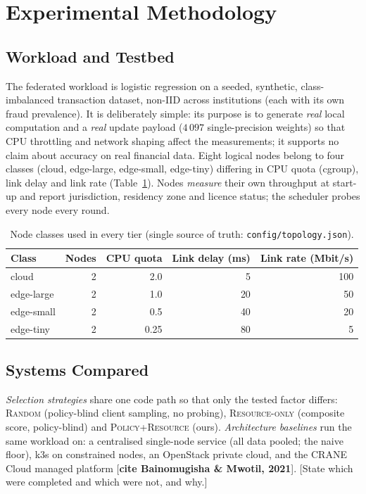 \section{Experimental Methodology}
\label{sec:method}
\subsection{Workload and Testbed}
The federated workload is logistic regression on a seeded, synthetic, class-imbalanced transaction dataset,
non-IID across institutions (each with its own fraud prevalence). It is deliberately simple: its purpose is to
generate \emph{real} local computation and a \emph{real} update payload ($4\,097$ single-precision weights) so that
CPU throttling and network shaping affect the measurements; it supports no claim about accuracy on real financial data.
Eight logical nodes belong to four classes (cloud, edge-large, edge-small, edge-tiny) differing in CPU quota
(cgroup), link delay and link rate (Table~\ref{tab:topology}). Nodes \emph{measure} their own throughput at start-up
and report jurisdiction, residency zone and licence status; the scheduler probes every node every round.

\begin{table}[t]\centering\footnotesize
\caption{Node classes used in every tier (single source of truth: \texttt{config/topology.json}).}\label{tab:topology}
\begin{tabular}{lrrrr}\toprule Class & Nodes & CPU quota & Link delay (ms) & Link rate (Mbit/s)\\\midrule
cloud & 2 & 2.0 & 5 & 100\\ edge-large & 2 & 1.0 & 20 & 50\\ edge-small & 2 & 0.5 & 40 & 20\\ edge-tiny & 2 & 0.25 & 80 & 5\\\bottomrule\end{tabular}
\end{table}

\subsection{Systems Compared}
\emph{Selection strategies} share one code path so that only the tested factor differs:
\textsc{Random} (policy-blind client sampling, no probing), \textsc{Resource-only} (composite score, policy-blind)
and \textsc{Policy+Resource} (ours). \emph{Architecture baselines} run the same workload on: a centralised
single-node service (all data pooled; the naive floor), k3s on constrained nodes, an OpenStack private cloud, and
the CRANE Cloud managed platform [\textbf{cite Bainomugisha \& Mwotil, 2021}]. [State which were completed and which
were not, and why.]

